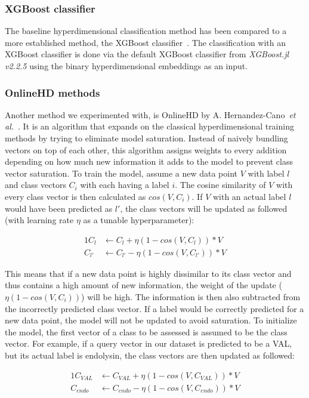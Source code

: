 \subsubsection*{XGBoost classifier}
The baseline hyperdimensional classification method has been compared to a more established method, the XGBoost classifier~\cite{xgboost}. The classification with an XGBoost classifier is done via the default XGBoost classifier from \textit{XGBoost.jl v2.2.5} using the binary hyperdimensional embeddings as an input.
\subsubsection*{OnlineHD methods}
Another method we experimented with, is OnlineHD by A. Hernandez-Cano~\textit{et al.}~\cite{onlinehd}. It is an algorithm that expands on the classical hyperdimensional training methods by trying to eliminate model saturation. Instead of naively bundling vectors on top of each other, this algorithm assigns weights to every addition depending on how much new information it adds to the model to prevent class vector saturation. To train the model, assume a new data point $V$ with label $l$ and class vectors $C_{i}$ with each having a label $i$. The cosine similarity of $V$ with every class vector is then calculated as $cos(V, C_{i})$. If $V$ with an actual label $l$ would have been predicted as $l'$, the class vectors will be updated as followed (with learning rate $\eta$ as a tunable hyperparameter):

\begin{alignat}{1}
    \label{eqn:onlinehd}
    C_{l} &\leftarrow C_{l} + \eta (1 - cos(V , C_{l})) * V \\
    C_{l'} &\leftarrow C_{l'} - \eta (1 - cos(V, C_{l'})) * V
\end{alignat}

This means that if a new data point is highly dissimilar to its class vector and thus contains a high amount of new information, the weight of the update ($\eta (1 - cos(V, C_{i}))$) will be high. The information is then also subtracted from the incorrectly predicted class vector. If a label would be correctly predicted for a new data point, the model will not be updated to avoid saturation. To initialize the model, the first vector of a class to be assessed is assumed to be the class vector. For example, if a query vector in our dataset is predicted to be a VAL, but its actual label is endolysin, the class vectors are then updated as followed:

\begin{alignat}{1}
    \label{eqn:onlinehd2}
    C_{VAL} &\leftarrow C_{VAL} + \eta (1 - cos(V, C_{VAL})) * V \\
    C_{endo} &\leftarrow C_{endo} - \eta (1 - cos(V, C_{endo})) * V
\end{alignat}

